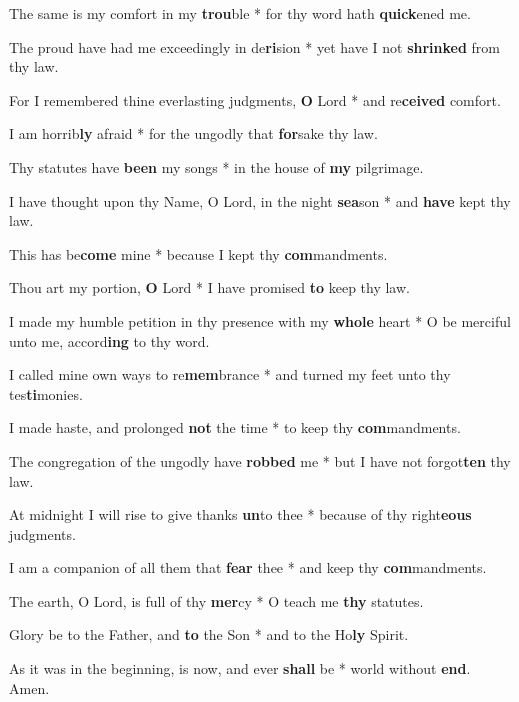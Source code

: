 \begin{multicols}{2}
	The same is my comfort in my \textbf{trou}ble * for thy word hath \textbf{quick}ened me.
	
	The proud have had me exceedingly in de\textbf{ri}sion * yet have I not \textbf{shrinked} from thy law.
	
	For I remembered thine everlasting judgments, \textbf{O} Lord * and re\textbf{ceived} comfort.
	
	I am horrib\textbf{ly} afraid * for the ungodly that \textbf{for}sake thy law.
	
	Thy statutes have \textbf{been} my songs * in the house of \textbf{my} pilgrimage.
	
	I have thought upon thy Name, O Lord, in the night \textbf{sea}son * and \textbf{have} kept thy law.
	
	This has be\textbf{come} mine * because I kept thy \textbf{com}mandments.
	
	Thou art my portion, \textbf{O} Lord * I have promised \textbf{to} keep thy law.
	
	I made my humble petition in thy presence with my \textbf{whole} heart * O be merciful unto me, accord\textbf{ing} to thy word.
	
	I called mine own ways to re\textbf{mem}brance * and turned my feet unto thy tes\textbf{ti}monies.
	
	I made haste, and prolonged \textbf{not} the time * to keep thy \textbf{com}mandments.
	
	The congregation of the ungodly have \textbf{robbed} me * but I have not forgot\textbf{ten} thy law.
	
	At midnight I will rise to give thanks \textbf{un}to thee * because of thy right\textbf{eous} judgments.
	
	I am a companion of all them that \textbf{fear} thee * and keep thy \textbf{com}mandments.
	
	The earth, O Lord, is full of thy \textbf{mer}cy * O teach me \textbf{thy} statutes.
	
	Glory be to the Father, and \textbf{to} the Son * and to the Ho\textbf{ly} Spirit.
	
	As it was in the beginning, is now, and ever \textbf{shall} be * world without \textbf{end}. Amen.
\end{multicols}